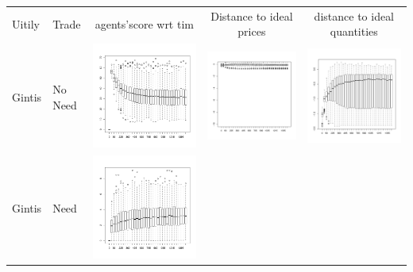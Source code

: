 \documentclass[a4paper]{article}
\begin{document}
	\begin{table}
	    \centering
	    \begin{tabular}{llccc}
		Uitily & Trade &agents'score wrt tim &  Distance to ideal prices & distance to ideal quantities \\
		Gintis & No Need & \includegraphics[width=.18\textwidth]{images/Scores-300Ag5goodrandnTradGintisNoNeedAccountGintisUitiliy.pdf} & 
		\includegraphics[width=.18\textwidth]{images/Prices-300Ag5goodrandnTradGintisNoNeedAccountGintisUitiliy.pdf} & 
		\includegraphics[width=.18\textwidth]{images/Quantities-300Ag5goodrandnTradGintisNoNeedAccountGintisUitiliy.pdf} \\
		Gintis & Need & \includegraphics[width=.18\textwidth]{images/Scores-300Ag5goodrandnTradGintisTakingNeedAccountGintisUitiliy.pdf} & 

\end{tabular}
\end{table}
\end{document}
